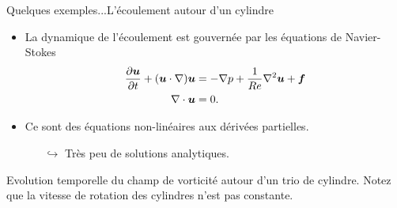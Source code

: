 \documentclass[usenames,dvipsnames,svgnames,10pt,aspectratio=169]{beamer}
\begin{document}
\begin{frame}[t, c]{Quelques exemples...}{L'écoulement autour d'un cylindre}
	\begin{minipage}{0.48\textwidth}
		\begin{itemize}
			\item La dynamique de l'écoulement est gouvernée par les équations de Navier-Stokes
			\begin{equation}
				\begin{aligned}
					\displaystyle \frac{\partial {\bm u}}{\partial t} + ({\bm u} \cdot \nabla ) {\bm u} & = - \nabla p + \frac{1}{Re}\nabla^2 {\bm u} + {\bm f}\\
					\nabla \cdot {\bm u} & = 0.
				\end{aligned}
				\notag
			\end{equation}

			\item Ce sont des équations non-linéaires aux dérivées partielles.
			\begin{itemize}
				\item[$\hookrightarrow$] Très peu de solutions analytiques.
			\end{itemize}

		\end{itemize}
	\end{minipage}%
	\hfill
	\begin{minipage}{0.48\textwidth}
		\begin{center}
		\end{center}

		{\small Evolution temporelle du champ de vorticité autour d'un trio de cylindre. Notez que la vitesse de rotation des cylindres n'est pas constante.}
	\end{minipage}
\end{frame}
\end{document}
